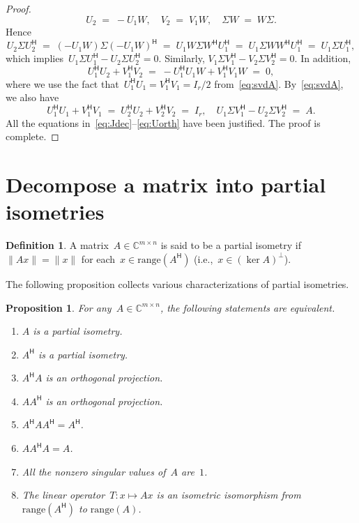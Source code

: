 \documentclass[11pt,a4paper]{article}
\newtheorem{proposition}{Proposition}%
\theoremstyle{definition}
\newtheorem{definition}{Definition}%
\def\CC{\mathbb{C}}
\newcommand{\hmt}{{\scriptscriptstyle{{\mathsf{H}}}}}
\newcommand{\range}{\mathrm{range}}
\newcommand{\ie}{{i.e.}}
\begin{document}
\begin{proof}
\begin{equation*}
    U_2 \;=\; -U_1W, \quad V_2 \;=\; V_1W, \quad \Sigma W \;=\; W\Sigma.
  \end{equation*}
  Hence
  \begin{equation*}
    U_2\Sigma U_2^\hmt \;=\; (-U_1W)\Sigma (-U_1W)^\hmt \;=\; U_1W\Sigma W^\hmt U_1^\hmt \;=\; U_1 \Sigma
    WW^\hmt U_1^\hmt \;=\; U_1\Sigma U_1^\hmt, 
  \end{equation*}
  which implies~$U_1\Sigma U_1^\hmt - U_2\Sigma U_2^\hmt = 0$. Similarly, $V_1\Sigma V_1^\hmt
  - V_2\Sigma V_2^\hmt = 0$. In addition,
  \begin{equation*}
    U_1^\hmt U_2 + V_1^\hmt V_2 \;=\; -U_1^\hmt U_1W + V_1^\hmt V_1W \;=\; 0,
  \end{equation*}
  where we use the fact that~$U_1^\hmt U_1 = V_1^\hmt V_1 = I_r/2$ from~\eqref{eq:svdA}.
  By~\eqref{eq:svdA}, we also have
  \begin{equation*}
    U_1^\hmt U_1 + V_1^\hmt V_1 \;=\;  U_2^\hmt U_2 + V_2^\hmt V_2 \;=\; I_r, \quad U_1\Sigma V_1^\hmt
    - U_2\Sigma V_2^\hmt \;=\; A. 
  \end{equation*}
  All the equations in~\eqref{eq:Jdec}--\eqref{eq:Uorth} have been justified. The proof is
  complete.
\end{proof}



\section{Decompose a matrix into partial isometries~\cite{Koranyi_2001}}

\begin{definition}
  A matrix~$A\in\CC^{m\times n}$ is said to be a partial isometry if~$\|Ax\|=\|x\|$ for
  each~$x\in \range(A^\hmt)$ (\ie,~$x\in (\ker A)^{\perp}$).
\end{definition}

The following proposition collects various characterizations of partial isometries. 

\begin{proposition}
  \label{prop:piso}
  For any~$A\in\CC^{m\times n}$, the following statements are equivalent. 
  \begin{enumerate}[leftmargin=1.5em]
    \item \label{it:ai} $A$ is a partial isometry. 
    \item \label{it:ahi} $A^\hmt$ is a partial isometry.
    \item \label{it:aha} $A^\hmt A$ is an orthogonal projection. 
    \item \label{it:aah} $AA^\hmt$ is an orthogonal projection.
    \item \label{it:ahaah} $A^\hmt A A^\hmt = A^\hmt$. 
    \item \label{it:aaha} $A A^\hmt A = A$. 
    \item \label{it:sina} All the nonzero singular values of~$A$ are~$1$. 
    \item \label{it:iso} The linear operator~$T\mathrel{:} x \mapsto Ax$ is an isometric isomorphism from~$\range(A^\hmt)$ to $\range(A)$.
  \end{enumerate}
\end{proposition}
\end{document}
